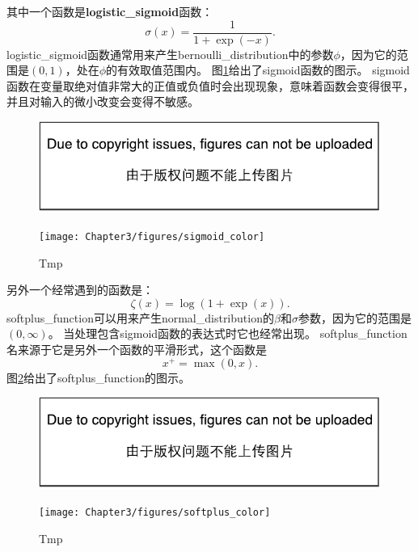 其中一个函数是\textbf{\gls{logistic_sigmoid}}函数：
\begin{equation}
\sigma(x) = \frac{1}{1+\exp(-x)}.
\end{equation}
\gls{logistic_sigmoid}函数通常用来产生\gls{bernoulli_distribution}中的参数$\phi$，因为它的范围是$(0,1)$，处在$\phi$的有效取值范围内。
图\ref{fig:chap3_sigmoid_color}给出了sigmoid函数的图示。
sigmoid函数在变量取绝对值非常大的正值或负值时会出现现象，意味着函数会变得很平，并且对输入的微小改变会变得不敏感。
\begin{figure}[!htb]
\ifOpenSource
\centerline{\includegraphics{figure.pdf}}
\else
\centerline{\texttt{[image: Chapter3/figures/sigmoid\_color]}}
\fi
\caption{Tmp}
\label{fig:chap3_sigmoid_color}
\end{figure}

另外一个经常遇到的函数是\citep{secondorder:2001:nips}：
\begin{equation}
\zeta(x) = \log(1+\exp(x)).
\end{equation}
\gls{softplus_function}可以用来产生\gls{normal_distribution}的$\beta$和$\sigma$参数，因为它的范围是$(0,\infty)$。
当处理包含sigmoid函数的表达式时它也经常出现。
\gls{softplus_function}名来源于它是另外一个函数的平滑形式，这个函数是
\begin{equation}
x^+ = \max(0, x).
\end{equation}
图\ref{fig:chap3_softplus_color}给出了\gls{softplus_function}的图示。
\begin{figure}[!htb]
\ifOpenSource
\centerline{\includegraphics{figure.pdf}}
\else
\centerline{\texttt{[image: Chapter3/figures/softplus\_color]}}
\fi
\caption{Tmp}
\label{fig:chap3_softplus_color}
\end{figure}


